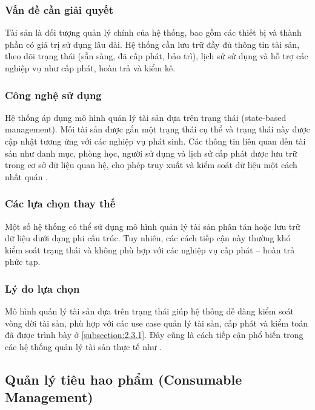 \documentclass[../DoAn.tex]{subfiles}
\begin{document}
\subsubsection{Vấn đề cần giải quyết}

Tài sản là đối tượng quản lý chính của hệ thống, bao gồm các thiết bị và thành phần có giá trị sử dụng lâu dài. Hệ thống cần lưu trữ đầy đủ thông tin tài sản, theo dõi trạng thái (sẵn sàng, đã cấp phát, bảo trì), lịch sử sử dụng và hỗ trợ các nghiệp vụ như cấp phát, hoàn trả và kiểm kê.

\subsubsection{Công nghệ sử dụng}

Hệ thống áp dụng mô hình quản lý tài sản dựa trên trạng thái (state-based management). Mỗi tài sản được gắn một trạng thái cụ thể và trạng thái này được cập nhật tương ứng với các nghiệp vụ phát sinh. Các thông tin liên quan đến tài sản như danh mục, phòng học, người sử dụng và lịch sử cấp phát được lưu trữ trong cơ sở dữ liệu quan hệ, cho phép truy xuất và kiểm soát dữ liệu một cách nhất quán  \cite{cloudcomputing2010nist, mysql2024docs}.

\subsubsection{Các lựa chọn thay thế}

Một số hệ thống có thể sử dụng mô hình quản lý tài sản phân tán hoặc lưu trữ dữ liệu dưới dạng phi cấu trúc. Tuy nhiên, các cách tiếp cận này thường khó kiểm soát trạng thái và không phù hợp với các nghiệp vụ cấp phát – hoàn trả phức tạp.

\subsubsection{Lý do lựa chọn}

Mô hình quản lý tài sản dựa trên trạng thái giúp hệ thống dễ dàng kiểm soát vòng đời tài sản, phù hợp với các use case quản lý tài sản, cấp phát và kiểm toán đã được trình bày ở \autoref{subsection:2.3.1}. Đây cũng là cách tiếp cận phổ biến trong các hệ thống quản lý tài sản thực tế như .

\subsection{Quản lý tiêu hao phẩm (Consumable Management)}
\end{document}

